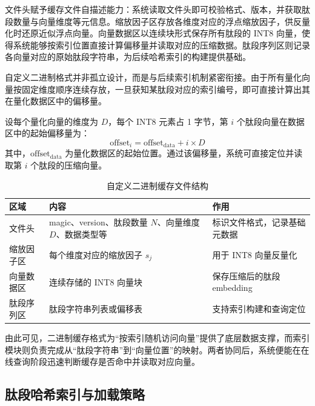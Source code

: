 文件头赋予缓存文件自描述能力：系统读取文件头即可校验格式、版本，并获取肽段数量与向量维度等元信息。缩放因子区存放各维度对应的浮点缩放因子，供反量化时还原近似浮点向量。向量数据区以连续块形式保存所有肽段的 INT8 向量，使得系统能够按索引位置直接计算偏移量并读取对应的压缩数据。肽段序列区则记录各向量对应的原始肽段字符串，为后续哈希索引的构建提供基础。

自定义二进制格式并非孤立设计，而是与后续索引机制紧密衔接。由于所有量化向量按固定维度顺序连续存放，一旦获知某肽段对应的索引编号，即可直接计算出其在量化数据区中的偏移量。

设每个量化向量的维度为 $D$，每个 INT8 元素占 1 字节，第 $i$ 个肽段向量在数据区中的起始偏移量为：
\[
    \mathrm{offset}_i
    =
    \mathrm{offset}_{\mathrm{data}}
    +
    i \times D
\]
其中，$\mathrm{offset}_{\mathrm{data}}$ 为量化数据区的起始位置。通过该偏移量，系统可直接定位并读取第 $i$ 个肽段的压缩向量。

\begin{table}[htbp]
    \centering
    \caption{自定义二进制缓存文件结构}
    \label{tab:binary-cache-format}
    \begin{tabular}{p{} p{} p{}}
        \toprule
        区域 & 内容 & 作用 \\
        \midrule
        文件头
        & magic、version、肽段数量 $N$、向量维度 $D$、数据类型等
        & 标识文件格式，记录基础元数据 \\

        缩放因子区
        & 每个维度对应的缩放因子 $s_j$
        & 用于 INT8 向量反量化 \\

        向量数据区
        & 连续存储的 INT8 向量块
        & 保存压缩后的肽段 embedding \\

        肽段序列区
        & 肽段字符串列表或偏移表
        & 支持索引构建和查询定位 \\
        \bottomrule
    \end{tabular}
\end{table}

由此可见，二进制缓存格式为“按索引随机访问向量”提供了底层数据支撑，而索引模块则负责完成从“肽段字符串”到“向量位置”的映射。两者协同后，系统便能在在线查询阶段迅速判断缓存是否命中并读取对应向量。

\subsection{肽段哈希索引与加载策略}

